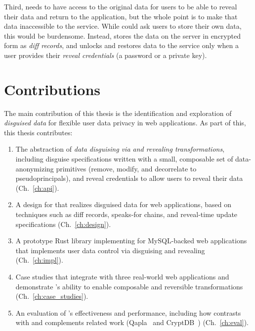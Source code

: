 %
Third, \sys needs to have access to the original data for users to be able to
reveal their data and return to the application, but the whole point is to make
that data inaccessible to the service.
%
While \sys could ask users to store their own \xxed data, this would be
burdensome.
%
Instead, \sys stores the \xxed data on the server in encrypted form as
\emph{diff records}, and unlocks
and restores data to the service only when a user provides their \emph{reveal
credentials} (\eg a password or a private key).

%
\section{Contributions}
%
The main contribution of this thesis is the identification and exploration of
\emph{disguised data} for flexible user data privacy in web applications. As
part of this, this thesis contributes:

\begin{enumerate}
    \item The abstraction of \emph{data disguising via \xxing and revealing
        transformations}, including 
        disguise specifications written with a small, composable set of
        data-anonymizing primitives (remove, modify, and decorrelate to
        pseudoprincipals), and reveal credentials to allow users
        to reveal their data (Ch.~\ref{ch:api}).

    \item A design for \sys that realizes disguised data for web applications,
        based on techniques such as diff records, speaks-for chains, and
        reveal-time update specifications
        (Ch.~\ref{ch:design}).

    \item A prototype Rust library implementing \sys for MySQL-backed web applications that
        implements user data control via disguising and revealing
        (Ch.~\ref{ch:impl}).

    \item Case studies that integrate \sys with three real-world web
    applications and demonstrate \sys's ability to enable composable and
        reversible transformations (Ch.~\ref{ch:case_studies}).

    \item An evaluation of \sys's effectiveness and performance, including how
    \sys contrasts with and complements related work (Qapla~\cite{qapla} and
        CryptDB~\cite{cryptdb}) (Ch.~\ref{ch:eval}).
\end{enumerate}
%

